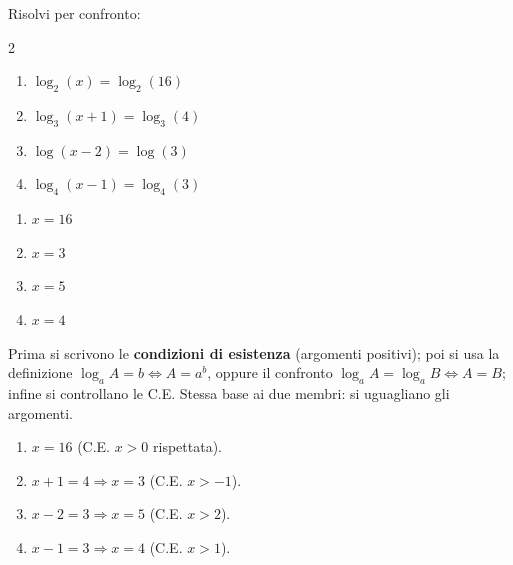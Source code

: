 
\begin{question}[ID=2.3, subtitle={Equazioni logaritmiche per confronto}, difficulty=media, tags={equazioni logaritmiche, confronto}]
Risolvi per confronto:
\begin{center}\begin{minipage}{0.92\linewidth}
\begin{multicols}{2}
\begin{enumerate}[leftmargin=3.2cm]
\item $\log_2(x) = \log_2(16)$
\item $\log_3(x+1) = \log_3(4)$
\item $\log(x-2) = \log(3)$
\item $\log_4(x-1) = \log_4(3)$
\end{enumerate}
\end{multicols}
\end{minipage}\end{center}
\begin{solution}
\begin{enumerate}
    \item $x=16$
    \item $x=3$
    \item $x=5$
    \item $x=4$
\end{enumerate}
\end{solution}
\begin{explanation}
Prima si scrivono le \textbf{condizioni di esistenza} (argomenti positivi); poi si usa la definizione $\log_a A=b \iff A=a^b$, oppure il confronto $\log_aA=\log_aB \iff A=B$; infine si controllano le C.E.
Stessa base ai due membri: si uguagliano gli argomenti.
\begin{enumerate}
    \item $x=16$ (C.E. $x>0$ rispettata).
    \item $x+1=4 \Rightarrow x=3$ (C.E. $x>-1$).
    \item $x-2=3 \Rightarrow x=5$ (C.E. $x>2$).
    \item $x-1=3 \Rightarrow x=4$ (C.E. $x>1$).
\end{enumerate}
\end{explanation}
\end{question}


